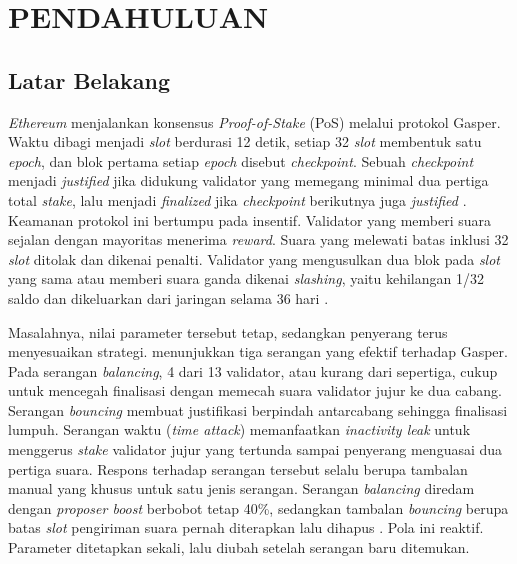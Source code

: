 \cleardoublepage %
\chapter{PENDAHULUAN}
\label{chap:pendahuluan}

\section{Latar Belakang}
\label{sec:latar_belakang}

\textit{Ethereum} menjalankan konsensus \textit{Proof-of-Stake} (PoS) melalui protokol Gasper. Waktu dibagi menjadi \textit{slot} berdurasi 12 detik, setiap 32 \textit{slot} membentuk satu \textit{epoch}, dan blok pertama setiap \textit{epoch} disebut \textit{checkpoint}. Sebuah \textit{checkpoint} menjadi \textit{justified} jika didukung validator yang memegang minimal dua pertiga total \textit{stake}, lalu menjadi \textit{finalized} jika \textit{checkpoint} berikutnya juga \textit{justified} \parencite{laneve2025stochastic}. Keamanan protokol ini bertumpu pada insentif. Validator yang memberi suara sejalan dengan mayoritas menerima \textit{reward}. Suara yang melewati batas inklusi 32 \textit{slot} ditolak dan dikenai penalti. Validator yang mengusulkan dua blok pada \textit{slot} yang sama atau memberi suara ganda dikenai \textit{slashing}, yaitu kehilangan 1/32 saldo dan dikeluarkan dari jaringan selama 36 hari \parencite{laneve2025stochastic}.

Masalahnya, nilai parameter tersebut tetap, sedangkan penyerang terus menyesuaikan strategi. \textcite{laneve2025stochastic} menunjukkan tiga serangan yang efektif terhadap Gasper. Pada serangan \textit{balancing}, 4 dari 13 validator, atau kurang dari sepertiga, cukup untuk mencegah finalisasi dengan memecah suara validator jujur ke dua cabang. Serangan \textit{bouncing} membuat justifikasi berpindah antarcabang sehingga finalisasi lumpuh. Serangan waktu (\textit{time attack}) memanfaatkan \textit{inactivity leak} untuk menggerus \textit{stake} validator jujur yang tertunda sampai penyerang menguasai dua pertiga suara. Respons terhadap serangan tersebut selalu berupa tambalan manual yang khusus untuk satu jenis serangan. Serangan \textit{balancing} diredam dengan \textit{proposer boost} berbobot tetap 40\%, sedangkan tambalan \textit{bouncing} berupa batas \textit{slot} pengiriman suara pernah diterapkan lalu dihapus \parencite{laneve2025stochastic}. Pola ini reaktif. Parameter ditetapkan sekali, lalu diubah setelah serangan baru ditemukan.

